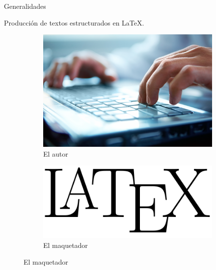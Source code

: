 \documentclass[10pt]{beamer}
\begin{document}
\begin{frame}{Generalidades}
	\begin{block}{Producción de textos estructurados en \LaTeX{}.}
	\vspace{-.4cm}
	\begin{multicols}{2}
		\begin{figure}
			\centering
			\begin{subfigure}[b]{0.5\textwidth} 
				\centering
				\includegraphics[scale=.08]{figures/autor_LaTeX}
				\caption{El autor}			
			\end{subfigure}
			
			\vspace*{.25cm}			
			
			\begin{subfigure}[b]{0.5\textwidth} 
				\centering
				\includegraphics[scale=.09]{figures/maquetador_LaTeX}
				\caption{El maquetador}
			\end{subfigure}
			
			\vspace*{.25cm}				
			

\end{figure}
\end{multicols}
\end{block}
\end{frame}
\end{document}
